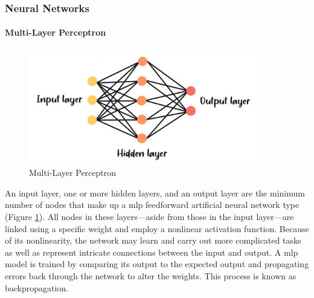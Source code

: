 \subsubsection{Neural Networks}
\paragraph{Multi-Layer Perceptron}
\begin{figure}[!ht]
    \centering
    \includegraphics[width=10cm]{Images/mlp.png}
    \caption{Multi-Layer Perceptron}
    \label{fig:mlp}
\end{figure}
An input layer, one or more hidden layers, and an output layer are the minimum number of nodes that make up a \gls{mlp} feedforward artificial neural network type (Figure \ref{fig:mlp}).
All nodes in these layers—aside from those in the input layer—are linked using a specific weight and employ a nonlinear activation function.
Because of its nonlinearity, the network may learn and carry out more complicated tasks as well as represent intricate connections between the input and output.
A \gls{mlp} model is trained by comparing its output to the expected output and propagating errors back through the network to alter the weights. 
This process is known as backpropagation. \\\citep{haykin_2014_neural}

